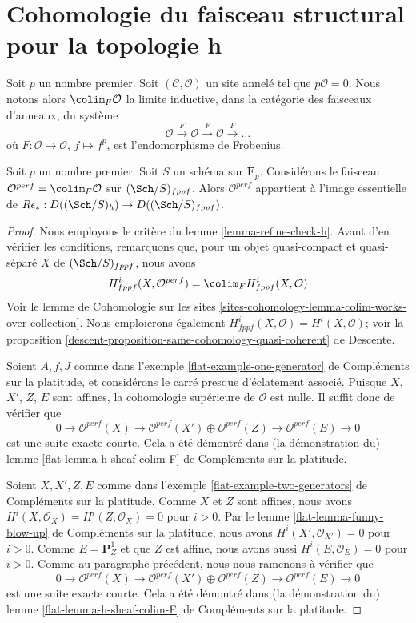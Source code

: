 \section{Cohomologie du faisceau structural pour la topologie h}
\label{section-cohomology-O-h}

\noindent
Soit $p$ un nombre premier. Soit $(\mathcal{C}, \mathcal{O})$ un site annelé
tel que $p\mathcal{O} = 0$. Nous notons alors $\colim_F \mathcal{O}$
la limite inductive, dans la catégorie des faisceaux d'anneaux, du système
$$
\mathcal{O} \xrightarrow{F} \mathcal{O} \xrightarrow{F}
\mathcal{O} \xrightarrow{F} \ldots
$$
où $F : \mathcal{O} \to \mathcal{O}$, $f \mapsto f^p$,
est l'endomorphisme de Frobenius.

\begin{lemma}
\label{lemma-h-sheaf-colim-F}
Soit $p$ un nombre premier. Soit $S$ un schéma sur $\mathbf{F}_p$.
Considérons le faisceau $\mathcal{O}^{perf} = \colim_F \mathcal{O}$
sur $(\Sch/S)_{fppf}$. Alors $\mathcal{O}^{perf}$ appartient à l'image
essentielle de $R\epsilon_* : D((\Sch/S)_h) \to D((\Sch/S)_{fppf})$.
\end{lemma}

\begin{proof}
Nous employons le critère du lemme \ref{lemma-refine-check-h}.
Avant d'en vérifier les conditions, remarquons que, pour un objet
quasi-compact et quasi-séparé $X$ de
$(\Sch/S)_{fppf}$, nous avons
$$
H^i_{fppf}(X, \mathcal{O}^{perf}) = \colim_F H^i_{fppf}(X, \mathcal{O})
$$
Voir le lemme de Cohomologie sur les sites
\ref{sites-cohomology-lemma-colim-works-over-collection}.
Nous emploierons également $H^i_{fppf}(X, \mathcal{O}) = H^i(X, \mathcal{O})$; voir la
proposition \ref{descent-proposition-same-cohomology-quasi-coherent} de Descente.

\medskip\noindent
Soient $A, f, J$ comme dans
l'exemple \ref{flat-example-one-generator} de Compléments sur la platitude,
et considérons le carré presque d'éclatement associé.
Puisque $X$, $X'$, $Z$, $E$ sont affines, la cohomologie
supérieure de $\mathcal{O}$ est nulle. Il suffit donc
de vérifier que
$$
0 \to
\mathcal{O}^{perf}(X) \to
\mathcal{O}^{perf}(X') \oplus \mathcal{O}^{perf}(Z) \to
\mathcal{O}^{perf}(E) \to 0
$$
est une suite exacte courte. Cela a été démontré dans (la démonstration du)
lemme \ref{flat-lemma-h-sheaf-colim-F} de Compléments sur la platitude.

\medskip\noindent
Soient $X, X', Z, E$ comme dans
l'exemple \ref{flat-example-two-generators} de Compléments sur la platitude.
Comme $X$ et $Z$ sont affines, nous avons
$H^i(X, \mathcal{O}_X) = H^i(Z, \mathcal{O}_X) = 0$ pour $i > 0$.
Par le lemme \ref{flat-lemma-funny-blow-up} de Compléments sur la platitude,
nous avons $H^i(X', \mathcal{O}_{X'}) = 0$ pour $i > 0$.
Comme $E = \mathbf{P}^1_Z$ et que $Z$ est affine, nous avons aussi
$H^i(E, \mathcal{O}_E) = 0$ pour $i > 0$. Comme au paragraphe
précédent, nous nous ramenons à vérifier que
$$
0 \to
\mathcal{O}^{perf}(X) \to
\mathcal{O}^{perf}(X') \oplus \mathcal{O}^{perf}(Z) \to
\mathcal{O}^{perf}(E) \to 0
$$
est une suite exacte courte. Cela a été démontré dans (la démonstration du)
lemme \ref{flat-lemma-h-sheaf-colim-F} de Compléments sur la platitude.
\end{proof}

